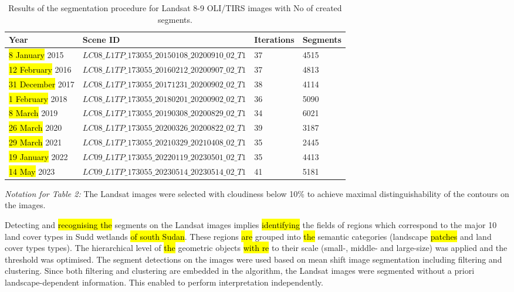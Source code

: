 \documentclass[sustainability,article,submit,pdftex,moreauthors]{Definitions/mdpi}
\begin{document}
\begin{table}[H] 
\begin{threeparttable}
\centering
\caption{Results of the segmentation procedure for Landsat 8-9 OLI/TIRS images with No of created segments.\label{tab02}}
\begin{tabularx}{\textwidth}{p{2.5cm}p{6.8cm}p{1.7cm}p{2.5cm}}
\toprule
\textbf{Year} & \textbf{Scene ID} & \textbf{Iterations} & \textbf{Segments} \\
\midrule
\hl{8 January} 2015 & $LC08\_L1TP\_173055\_20150108\_20200910\_02\_T1$ & 37 & 4515  \\
\hl{12 February} 2016 & $LC08\_L1TP\_173055\_20160212\_20200907\_02\_T1$ & 37 & 4813  \\
\hl{31 December} 2017 & $LC08\_L1TP\_173055\_20171231\_20200902\_02\_T1$ & 38 & 4114  \\
\hl{1 February} 2018 & $LC08\_L1TP\_173055\_20180201\_20200902\_02\_T1$ & 36 & 5090  \\
\hl{8 March} 2019 & $LC08\_L1TP\_173055\_20190308\_20200829\_02\_T1$ & 34 & 6021  \\
\hl{26 March} 2020 & $LC08\_L1TP\_173055\_20200326\_20200822\_02\_T1$ & 39 & 3187  \\
\hl{29 March} 2021 & $LC08\_L1TP\_173055\_20210329\_20210408\_02\_T1$ & 35 & 2445  \\
\hl{19 January} 2022 & $LC09\_L1TP\_173055\_20220119\_20230501\_02\_T1$ & 35 & 4413  \\
\hl{14 May} 2023 & $LC09\_L1TP\_173055\_20230514\_20230514\_02\_T1$ & 41 & 5181  \\
\bottomrule
\end{tabularx}
\begin{tablenotes}
      \small
      	\item \emph{Notation for Table 2:} The Landsat images were selected with cloudiness below 10\% to achieve maximal distinguishability of the contours on the images.
    \end{tablenotes}
  \end{threeparttable}
\end{table}

Detecting and \hl{recognising the} segments on the Landsat images implies \hl{identifying} the fields of regions which correspond to the major 10 land cover types in Sudd wetlands \hl{of south Sudan}. These regions \hl{are} grouped into \hl{the }semantic categories (landscape \hl{patches} and land cover types types). The hierarchical level of \hl{the }geometric objects \hl{with re} to their scale (small-, middle- and large-size) was applied and the threshold was optimised. The segment detections on the images were used based on mean shift image segmentation including  filtering and clustering. Since both filtering and clustering are embedded in the algorithm, the Landsat images were segmented without a priori landscape-dependent information. This enabled to perform interpretation independently.  
\end{document}

